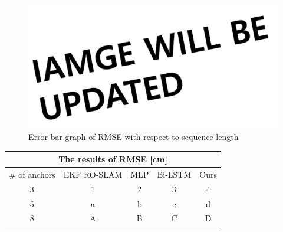 \documentclass[letterpaper, 10 pt, conference]{ieeeconf}  %
\begin{document}




\begin{figure}[h!]
	\centering
	\includegraphics[width=0.9\linewidth]{image/be_updated}
	\caption{Error bar graph of RMSE with respect to sequence length}
	\label{fig:seq_length} 	
\end{figure}
\begin{table}[]
	\centering
	\begin{tabular}{ccccc}
		\hline
		\multicolumn{5}{c}{The results of RMSE {[}cm{]}}   \\ \hline
		\# of anchors & EKF RO-SLAM & MLP & Bi-LSTM & Ours \\ \cline{2-5} 
		3             & 1           & 2   & 3       & 4    \\
		5             & a           & b   & c       & d    \\
		8             & A           & B   & C       & D    \\ \hline
	\end{tabular}
\end{table}
\end{document}
